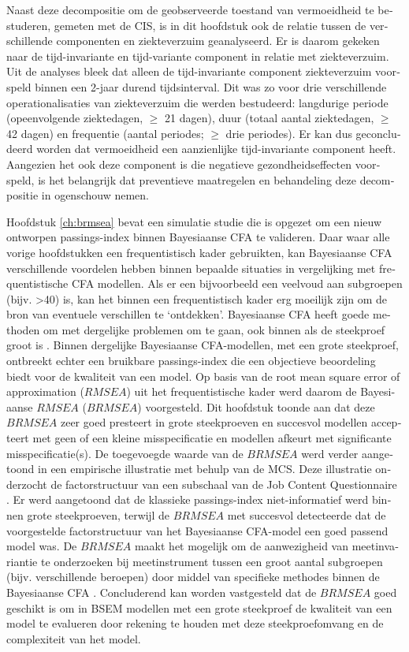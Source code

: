 \begin{otherlanguage}{dutch}
Naast deze decompositie om de geobserveerde toestand van vermoeidheid te bestuderen, gemeten met de CIS, is in dit hoofdstuk ook de relatie tussen de verschillende componenten en ziekteverzuim geanalyseerd. Er is daarom gekeken naar de tijd-invariante en tijd-variante component in relatie met ziekteverzuim. Uit de analyses bleek dat alleen de tijd-invariante component ziekteverzuim voorspeld binnen een 2-jaar durend tijdsinterval. Dit was zo voor drie verschillende operationalisaties van ziekteverzuim die werden bestudeerd: langdurige periode (opeenvolgende ziektedagen, $\geq$ 21 dagen), duur (totaal aantal ziektedagen, $\geq$ 42 dagen) en frequentie (aantal periodes; $\geq$ drie periodes). Er kan dus geconcludeerd worden dat vermoeidheid een aanzienlijke tijd-invariante component heeft. Aangezien het ook deze component is die negatieve gezondheidseffecten voorspeld, is het belangrijk dat preventieve maatregelen en behandeling deze decompositie in ogenschouw nemen.   

Hoofdstuk \ref{ch:brmsea} bevat een simulatie studie die is opgezet om een nieuw ontworpen passings-index binnen Bayesiaanse CFA te valideren. Daar waar alle vorige hoofdstukken een frequentistisch kader gebruikten, kan Bayesiaanse CFA verschillende voordelen hebben binnen bepaalde situaties in vergelijking met frequentistische CFA modellen. Als er een bijvoorbeeld een veelvoud aan subgroepen (bijv. >40) is, kan het binnen een frequentistisch kader erg moeilijk zijn om de bron van eventuele verschillen te `ontdekken'. Bayesiaanse CFA heeft goede methoden om met dergelijke problemen om te gaan, ook binnen als de steekproef groot is \parencite{Schoot_2014}. Binnen dergelijke Bayesiaanse CFA-modellen, met een grote steekproef, ontbreekt echter een bruikbare passings-index die een objectieve beoordeling biedt voor de kwaliteit van een model. Op basis van de root mean square error of approximation ($RMSEA$) uit het frequentistische kader werd daarom de Bayesiaanse $RMSEA$ ($BRMSEA$) voorgesteld. Dit hoofdstuk toonde aan dat deze $BRMSEA$ zeer goed presteert in grote steekproeven en succesvol modellen accepteert met geen of een kleine misspecificatie en modellen afkeurt met significante misspecificatie(s). De toegevoegde waarde van de $BRMSEA$ werd verder aangetoond in een empirische illustratie met behulp van de MCS. Deze illustratie onderzocht de factorstructuur van een subschaal van de Job Content Questionnaire \parencite{Karasek_1985}. Er werd aangetoond dat de klassieke passings-index niet-informatief werd binnen grote steekproeven, terwijl de $BRMSEA$ met succesvol detecteerde dat de voorgestelde factorstructuur van het Bayesiaanse CFA-model een goed passend model was. De $BRMSEA$ maakt het mogelijk om de aanwezigheid van meetinvariantie te onderzoeken bij meetinstrument tussen een groot aantal subgroepen (bijv. verschillende beroepen) door middel van specifieke methodes binnen de Bayesiaanse CFA \parencite{Schoot_2013a}. Concluderend kan worden vastgesteld dat de $BRMSEA$ goed geschikt is om in BSEM modellen met een grote steekproef de kwaliteit van een model te evalueren door rekening te houden met deze steekproefomvang en de complexiteit van het model.


\end{otherlanguage}
